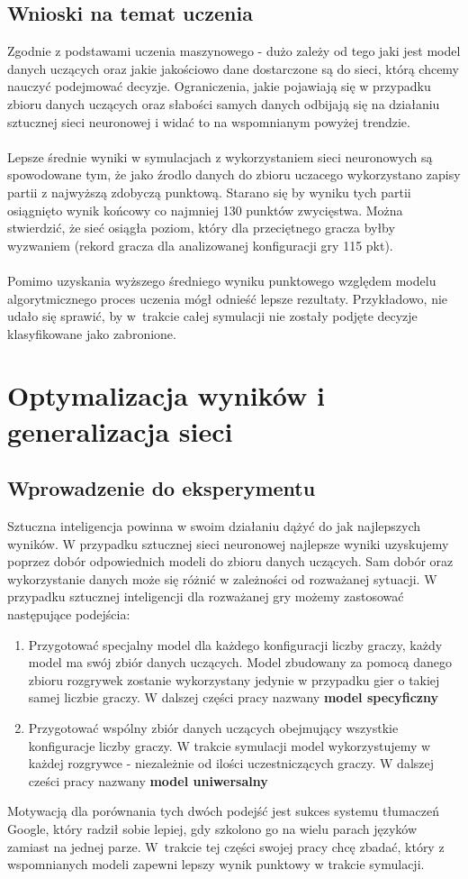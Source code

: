 \documentclass[12pt, oneside]{report}
\begin{document}
	\section{Wnioski na temat uczenia}
	Zgodnie z podstawami uczenia maszynowego - dużo zależy od tego jaki jest model danych uczących oraz jakie jakościowo dane dostarczone są do sieci, którą chcemy nauczyć podejmować decyzje. Ograniczenia, jakie pojawiają się w przypadku zbioru danych uczących oraz słabości samych danych odbijają się na działaniu sztucznej sieci neuronowej i widać to na wspomnianym powyżej trendzie. \\ \\ 
	Lepsze średnie wyniki w symulacjach z wykorzystaniem sieci neuronowych są spowodowane tym, że jako źrodlo danych do zbioru uczacego wykorzystano zapisy partii z najwyższą zdobyczą punktową. Starano się by wyniku tych partii osiągnięto wynik końcowy co najmniej 130 punktów zwycięstwa. Można stwierdzić, że sieć osiągła poziom, który dla przeciętnego gracza byłby wyzwaniem (rekord gracza dla analizowanej konfiguracji gry 115 pkt).
	\\ \\
	Pomimo uzyskania wyższego średniego wyniku punktowego względem modelu algorytmicznego proces uczenia mógł odnieść lepsze rezultaty. Przykładowo, nie udało się sprawić, by w~trakcie całej symulacji nie zostały podjęte decyzje klasyfikowane jako zabronione. 
	\chapter{Optymalizacja wyników i generalizacja sieci}
	\section{Wprowadzenie do eksperymentu}
	\label{ch:compare_data}
	Sztuczna inteligencja powinna w swoim działaniu dążyć do jak najlepszych wyników. W przypadku sztucznej sieci neuronowej najlepsze wyniki uzyskujemy poprzez dobór odpowiednich modeli do zbioru danych uczących. Sam dobór oraz wykorzystanie danych może się różnić w zależności od rozważanej sytuacji. W przypadku sztucznej inteligencji dla rozważanej gry możemy zastosować następujące podejścia:
	
	\begin{enumerate}
		\item Przygotować specjalny model dla każdego konfiguracji liczby graczy, każdy model ma swój zbiór danych uczących. Model zbudowany za pomocą danego zbioru rozgrywek zostanie wykorzystany jedynie w przypadku gier o takiej samej liczbie graczy. W dalszej części pracy nazwany \textbf{model specyficzny}
		\item Przygotować wspólny zbiór danych uczących obejmujący wszystkie konfiguracje liczby graczy. W trakcie symulacji model wykorzystujemy w każdej rozgrywce - niezależnie od ilości uczestniczących graczy. W dalszej cześci pracy nazwany \textbf{model uniwersalny}
	\end{enumerate}
	Motywacją dla porównania tych dwóch podejść jest sukces systemu tłumaczeń Google, który radził sobie lepiej, gdy szkolono go na wielu parach języków zamiast na jednej parze. W~trakcie tej części swojej pracy chcę zbadać, który z wspomnianych modeli zapewni lepszy wynik punktowy w trakcie symulacji.
\end{document}
